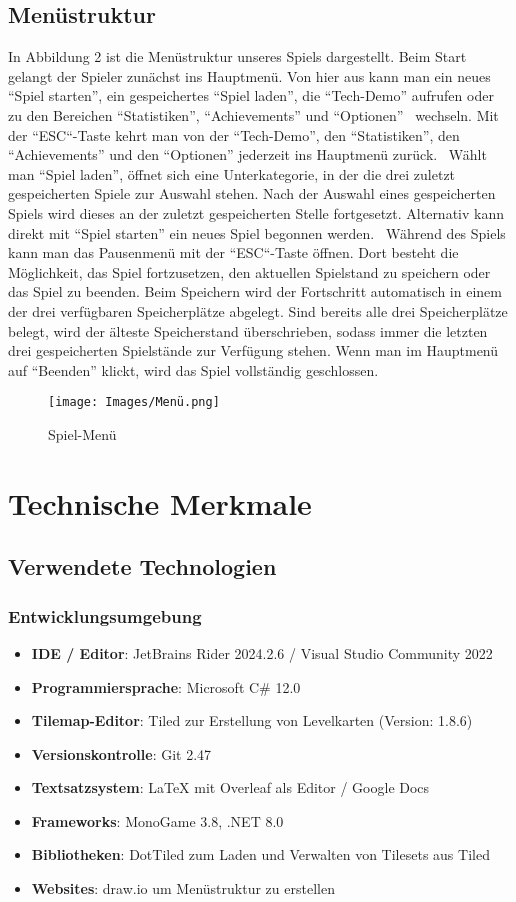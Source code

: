 \documentclass[11pt]{article}
\begin{document}
\subsection{Menüstruktur}
In Abbildung 2 ist die Menüstruktur unseres Spiels dargestellt. Beim Start gelangt der Spieler zunächst ins Hauptmenü. Von hier aus kann man ein neues “Spiel starten”, ein gespeichertes “Spiel laden”, die “Tech-Demo” aufrufen oder zu den Bereichen “Statistiken”, “Achievements” und “Optionen”  wechseln. Mit der “ESC“-Taste kehrt man von der “Tech-Demo”, den “Statistiken”, den “Achievements” und den “Optionen” jederzeit ins Hauptmenü zurück. 
Wählt man “Spiel laden”, öffnet sich eine Unterkategorie, in der die drei zuletzt gespeicherten Spiele zur Auswahl stehen. Nach der Auswahl eines gespeicherten Spiels wird dieses an der zuletzt gespeicherten Stelle fortgesetzt. Alternativ kann direkt mit “Spiel starten” ein neues Spiel begonnen werden. 
Während des Spiels kann man das Pausenmenü mit der “ESC“-Taste öffnen. Dort besteht die Möglichkeit, das Spiel fortzusetzen, den aktuellen Spielstand zu speichern oder das Spiel zu beenden. Beim Speichern wird der Fortschritt automatisch in einem der drei verfügbaren Speicherplätze abgelegt. Sind bereits alle drei Speicherplätze belegt, wird der älteste Speicherstand überschrieben, sodass immer die letzten drei gespeicherten Spielstände zur Verfügung stehen.
Wenn man im Hauptmenü auf “Beenden” klickt, wird das Spiel vollständig geschlossen.
\begin{figure}[htbp]
    \centering
    \texttt{[image: Images/Menü.png]}
    \caption{Spiel-Menü}
\end{figure}
\newpage
\section{Technische Merkmale}
\subsection{Verwendete Technologien}
\subsubsection*{Entwicklungsumgebung}
\begin{itemize}
    \item \textbf{IDE / Editor}: JetBrains Rider 2024.2.6 / Visual Studio Community 2022
    \item \textbf{Programmiersprache}: Microsoft C\# 12.0
    \item \textbf{Tilemap-Editor}: Tiled zur Erstellung von Levelkarten (Version: 1.8.6)
    \item \textbf{Versionskontrolle}: Git 2.47
    \item \textbf{Textsatzsystem}: \LaTeX{} mit Overleaf als Editor / Google Docs
    \item \textbf{Frameworks}: MonoGame 3.8, .NET 8.0
    \item \textbf{Bibliotheken}: DotTiled zum Laden und Verwalten von Tilesets aus Tiled
    \item \textbf{Websites}: draw.io um Menüstruktur zu erstellen
\end{itemize}
\end{document}
